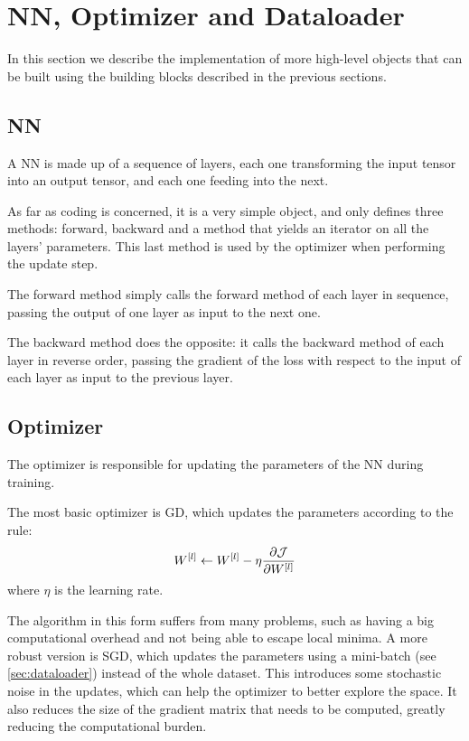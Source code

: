 \section{\acl*{NN}, Optimizer and Dataloader} \label{sec:nn-optim-data}
In this section we describe the implementation of more high-level objects that can be built using the building blocks described in the previous sections.

\subsection{\acl*{NN}}
A \acl{NN} is made up of a sequence of layers, each one transforming the input tensor into an output tensor, and each one feeding into the next.

As far as coding is concerned, it is a very simple object, and only defines three methods: forward, backward and a method that yields an iterator on all the layers' parameters. This last method is used by the optimizer when performing the update step.

The forward method simply calls the forward method of each layer in sequence, passing the output of one layer as input to the next one.

The backward method does the opposite: it calls the backward method of each layer in reverse order, passing the gradient of the loss with respect to the input of each layer as input to the previous layer.

\subsection{Optimizer}
The optimizer is responsible for updating the parameters of the \acl{NN} during training.

The most basic optimizer is \ac{GD}, which updates the parameters according to the rule:
\begin{equation}
    W^{[l]} \gets W^{[l]} - \eta \pdv{\mathcal{J}}{W^{[l]}}
\end{equation}
where $\eta$ is the learning rate.

The algorithm in this form suffers from many problems, such as having a big computational overhead and not being able to escape local minima. A more robust version is \ac{SGD}, which updates the parameters using a mini-batch (see \cref{sec:dataloader}) instead of the whole dataset. This introduces some stochastic noise in the updates, which can help the optimizer to better explore the space. It also reduces the size of the gradient matrix that needs to be computed, greatly reducing the computational burden.

